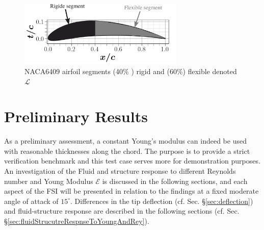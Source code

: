 \documentclass[conf]{new-aiaa}
\begin{document}
%
\begin{figure}[ht!]
\centering
\includegraphics[width=0.70\textwidth]{figs/airfoilgeo-crop.pdf}
\caption{NACA6409 airfoil segments (40\% ) rigid and (60\%) flexible denoted $\mathcal{L}$}
\label{fig:airfoilSegments} 
\end{figure}
\section{Preliminary Results}
\label{sec:preliminary}
As a preliminary assessment, a constant Young's modulus can indeed be used with reasonable thicknesses along the chord.
%
The purpose is to provide a strict verification benchmark and this test case serves more for demonstration purposes.
%
An investigation of the Fluid and structure response to different Reynolds number and Young Modulus $\mathcal{E}$ is discussed in the following sections, and each aspect of the FSI will be presented in relation to the findings  at a fixed moderate angle of attack of $15^{\circ}$.
%
Differences in the tip deflection (cf. Sec. \S\ref{sec:deflection}) and fluid-structure response are described in the following sections (cf. Sec. \S\ref{sec:fluidStrucutreRespnseToYoungAndRey}).
\end{document}
